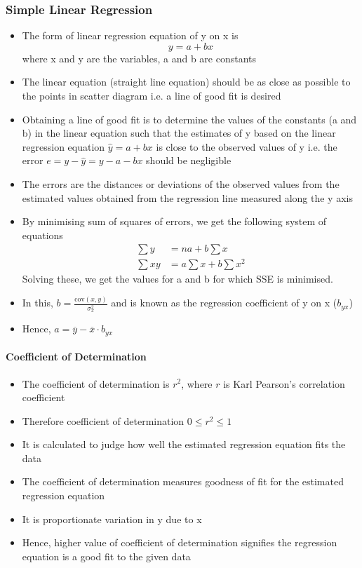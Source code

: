 \documentclass[
10pt, %
a4paper, %
]{report}
\begin{document}
\subsubsection*{Simple Linear Regression}
\begin{itemize}
\item The form of linear regression equation of y on x is
\[ y = a+bx\]
where x and y are the variables, a and b are constants
\item The linear equation (straight line equation) should be as close as possible to the points in scatter diagram i.e. a line of good fit is desired
\item Obtaining a line of good fit is to determine the values of the constants (a and b) in the linear equation such that the estimates of y based on the linear regression equation \(\hat{y} = a+bx\) is close to the observed values of y i.e. the error \(e = y - \hat{y} = y - a - bx\) should be negligible
\item The errors are the distances or deviations of the observed values from the estimated values obtained from the regression line measured along the y axis
\item By minimising sum of squares of errors, we get the following system of equations
\begin{align*}
\sum y &= na + b \sum x \\
\sum xy &= a\sum x + b \sum x^2
\end{align*}
Solving these, we get the values for a and b for which SSE is minimised.
\item In this, \(b = \frac{\mathrm{cov}(x, y)}{\sigma_x^2}\) and is known as the regression coefficient of y on x (\(b_{yx}\))
\item Hence, \(a = \overline{y} - \overline{x} \cdot b_{yx}\)
\end{itemize}

\paragraph*{Coefficient of Determination}

\begin{itemize}
\item The coefficient of determination is \(r^2\), where \(r\) is Karl Pearson’s correlation coefficient
\item Therefore coefficient of determination \(0 \le r^2 \le 1\)
\item It is calculated to judge how well the estimated regression equation fits the data
\item The coefficient of determination measures goodness of fit for the estimated regression equation
\item It is proportionate variation in y due to x
\item Hence, higher value of coefficient of determination signifies the regression equation is a good fit to the given data
\end{itemize}
\end{document}
